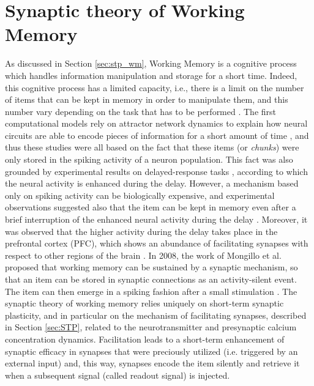 \documentclass[a4paper, 12pt, twoside, openright]{book}
\begin{document}
\section{Synaptic theory of Working Memory}
As discussed in Section \ref{sec:stp_wm}, Working Memory is a cognitive process which handles information manipulation and storage for a short time. Indeed, this cognitive process has a limited capacity, i.e., there is a limit on the number of items that can be kept in memory in order to manipulate them, and this number vary depending on the task that has to be performed \cite{Miller1956, cowan_2001, Cowan2010}.
The first computational models rely on attractor network dynamics to explain how neural circuits are able to encode pieces of information for a short amount of time \cite{hebb-organization-of-behavior-1949, Hopfield1982, Brunel2000}, and thus these studies were all based on the fact that these items (or \textit{chunks}) were only stored in the spiking activity of a neuron population. This fact was also grounded by experimental results on delayed-response tasks \cite{Funahashi1989, GoldmanRakic1995}, according to which the neural activity is enhanced during the delay. However, a mechanism based only on spiking activity can be biologically expensive, and experimental observations suggested also that the item can be kept in memory even after a brief interruption of the enhanced neural activity during the delay \cite{Stokes2015}. Moreover, it was observed that the higher activity during the delay takes place in the prefrontal cortex (PFC), which shows an abundance of facilitating synapses with respect to other regions of the brain \cite{Wang2006}. In 2008, the work of Mongillo et al. \cite{Mongillo2008} proposed that working memory can be sustained by a synaptic mechanism, so that an item can be stored in synaptic connections as an activity-silent event. The item can then emerge in a spiking fashion after a small stimulation \cite{Fusi2008}. The synaptic theory of working memory relies uniquely on short-term synaptic plasticity, and in particular on the mechanism of facilitating synapses, described in Section \ref{sec:STP}, related to the neurotransmitter and presynaptic calcium concentration dynamics. Facilitation leads to a short-term enhancement of synaptic efficacy in synapses that were preciously utilized (i.e. triggered by an external input) and, this way, synapses encode the item silently and retrieve it when a subsequent signal (called readout signal) is injected.
\end{document}
